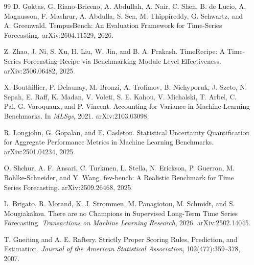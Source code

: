 \documentclass{article}
\begin{document}
\begin{thebibliography}{99}
D. Goktas, G. Riano-Briceno, A. Abdullah, A. Nair, C. Shen, B. de Lucio, A. Magnusson, F. Mashrur, A. Abdulla, S. Sen, M. Thippireddy, G. Schwartz, and A. Greenwald.
\newblock TempusBench: An Evaluation Framework for Time-Series Forecasting.
\newblock arXiv:2604.11529, 2026.

Z. Zhao, J. Ni, S. Xu, H. Liu, W. Jin, and B. A. Prakash.
\newblock TimeRecipe: A Time-Series Forecasting Recipe via Benchmarking Module Level Effectiveness.
\newblock arXiv:2506.06482, 2025.

X. Bouthillier, P. Delaunay, M. Bronzi, A. Trofimov, B. Nichyporuk, J. Szeto, N. Sepah, E. Raff, K. Madan, V. Voleti, S. E. Kahou, V. Michalski, T. Arbel, C. Pal, G. Varoquaux, and P. Vincent.
\newblock Accounting for Variance in Machine Learning Benchmarks.
\newblock In \emph{MLSys}, 2021. arXiv:2103.03098.

R. Longjohn, G. Gopalan, and E. Casleton.
\newblock Statistical Uncertainty Quantification for Aggregate Performance Metrics in Machine Learning Benchmarks.
\newblock arXiv:2501.04234, 2025.

O. Shchur, A. F. Ansari, C. Turkmen, L. Stella, N. Erickson, P. Guerron, M. Bohlke-Schneider, and Y. Wang.
\newblock fev-bench: A Realistic Benchmark for Time Series Forecasting.
\newblock arXiv:2509.26468, 2025.

L. Brigato, R. Morand, K. J. Strommen, M. Panagiotou, M. Schmidt, and S. Mougiakakou.
\newblock There are no Champions in Supervised Long-Term Time Series Forecasting.
\newblock \emph{Transactions on Machine Learning Research}, 2026. arXiv:2502.14045.

T. Gneiting and A. E. Raftery.
\newblock Strictly Proper Scoring Rules, Prediction, and Estimation.
\newblock \emph{Journal of the American Statistical Association}, 102(477):359--378, 2007.


\end{thebibliography}
\end{document}
